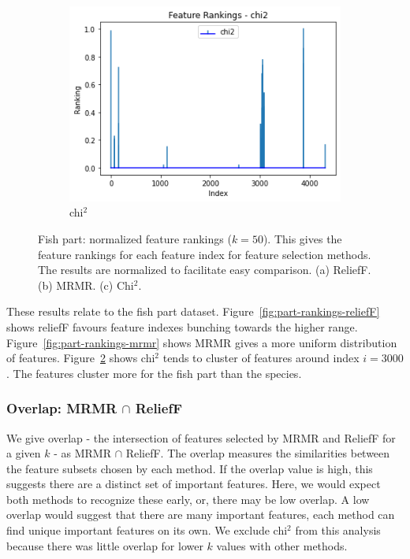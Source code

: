 \documentclass[runningheads]{llncs}
\begin{document}
\begin{figure}[htb]
  \begin{subfigure}[b]{\linewidth}
    \includegraphics[width=1\linewidth]{part_rankings_k-50_chi2.png}
    \caption{chi$^2$}
    \label{fig:part-rankings-chi2}
  \end{subfigure}

  \caption[Two numerical solutions]{
    Fish part: normalized feature rankings ($k=50$).
    This gives the feature rankings for each feature index for feature selection methods.
    The results are normalized to facilitate easy comparison.
    (a) ReliefF. (b) MRMR. (c) Chi$^2$.}
\end{figure}

These results relate to the fish part dataset.
Figure~\ref{fig:part-rankings-reliefF} shows reliefF favours feature indexes bunching towards the higher range.
Figure~\ref{fig:part-rankings-mrmr} shows MRMR gives a more uniform distribution of features.
Figure~\ref{fig:part-rankings-chi2} shows chi$^2$ tends to cluster of features around index $i = 3000$.
The features cluster more for the fish part than the species.

\subsubsection{Overlap: MRMR $\cap$ ReliefF}
\label{sec:results-visualisation-overlap-mrmr-reliefF}

We give overlap - the intersection of features selected by MRMR and ReliefF for a given $k$ - as MRMR $\cap$ ReliefF.
The overlap measures the similarities between the feature subsets chosen by each method.
If the overlap value is high, this suggests there are a distinct set of important features.
Here, we would expect both methods to recognize these early, or, there may be low overlap.
A low overlap would suggest that there are many important features, each method can find unique important features on its own.
We exclude chi$^2$ from this analysis because there was little overlap for lower $k$ values with other methods.
\end{document}
